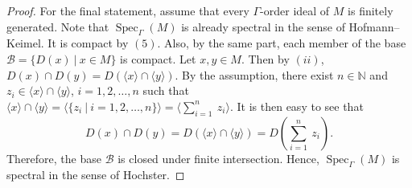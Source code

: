 \documentclass[10pt,a4paper]{amsart}
\newcommand{\Spec}{\operatorname{Spec}}
\begin{document}
\begin{proof}
For the final statement, assume that every $\Gamma$-order ideal of $M$ is finitely generated. Note that $\Spec_\Gamma(M)$ is already spectral in the sense of Hofmann--Keimel. It is compact by $(5)$. Also, by the same part, each member of the base $\mathcal{B}=\{D(x)~|~x\in M\}$ is compact. Let $x,y\in M$. Then by $(ii)$, $D(x)\cap D(y)=D\left(\langle x\rangle \cap \langle y\rangle\right)$. By the assumption, there exist $n\in \mathbb{N}$ and $z_i\in \langle x\rangle \cap \langle y\rangle$, $i=1,2,\ldots,n$ such that $\langle x\rangle \cap \langle y\rangle=\langle \{z_i~|~i=1,2,\ldots,n\}\rangle=\langle \displaystyle{\sum_{i=1}^{n}}~z_i\rangle$. It is then easy to see that \[D(x)\cap D(y)=D\left(\langle x\rangle \cap \langle y\rangle\right)=D\left(\displaystyle{\sum_{i=1}^{n}}~z_i\right).\] Therefore, the base $\mathcal{B}$ is closed under finite intersection. Hence, $\Spec_\Gamma(M)$ is spectral in the sense of Hochster. 
\end{proof}
\end{document}
